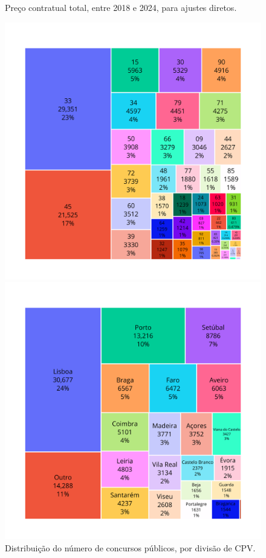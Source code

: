 \begin{figure}[H]
\begin{minipage}{.31\linewidth}
		\caption{Preço contratual total, entre 2018 e 2024, para ajustes diretos.}
		\label{fig:precoad2}
	\end{minipage}
\end{figure}


\clearpage
\begin{figure}[H]
	\centering
	
	\begin{minipage}[t]{0.49\textwidth}
		\centering
		\includegraphics[width=\textwidth]{imagens/treemap_cpub.png}
		\caption{Distribuição do número de concursos públicos, por divisão de CPV.}
		\label{fig:cpcpv}
	\end{minipage}
	\hfill
	\begin{minipage}[t]{0.49\textwidth}
		\centering
		\includegraphics[width=\textwidth]{imagens/treemap_cpub_distritos.png}

\end{minipage}
\end{figure}
